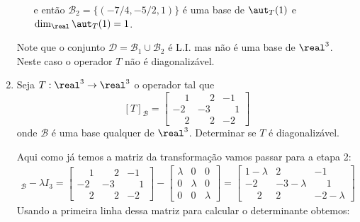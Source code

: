 \begin{exemplo}
\begin{enumerate}[label={\arabic*})]
\begin{solucao}
\begin{itemize}
\[                \]
                e então $\mathcal{B}_2 = \{(-7/4,-5/2,1)\}$ é uma base de $\aut_T(1)$ e $\dim_\real\aut_T(1) = 1$.
            \end{itemize}
            Note que o conjunto $\mathcal{D} = \mathcal{B}_1 \cup \mathcal{B}_2$ é L.I. mas não é uma base de $\real^3$. Neste caso o operador $T$ não é diagonalizável.
        \end{solucao}
        \item Seja $T : \real^3 \to \real^3$ o operador tal que
        \[
            [T]_\mathcal{B} = \begin{bmatrix}
                                \phantom{-}1 & \phantom{-}2 & -1\\
                                -2 & -3 & \phantom{-}1\\
                                \phantom{-}2 & \phantom{-}2 & -2
                            \end{bmatrix}
        \]
        onde $\mathcal{B}$ é uma base qualquer de $\real^3$. Determinar se $T$ é diagonalizável.
        \begin{solucao}
            Aqui como já temos a matriz da transformação vamos passar para a etapa 2:
            \begin{align*}
                [T]_\mathcal{B} - \lambda I_3 = \begin{bmatrix}\phantom{-}1 & \phantom{-}2 & -1\\-2 & -3 & \phantom{-}1\\\phantom{-}2 & \phantom{-}2 & -2\end{bmatrix} - \begin{bmatrix} \lambda & 0 & 0\\0 & \lambda & 0\\0 & 0 & \lambda\end{bmatrix} = \begin{bmatrix}1 - \lambda & 2 & -1\\-2 & -3 - \lambda & \phantom{-}1\\\phantom{-}2 & 2 &-2 - \lambda\end{bmatrix}
            \end{align*}
            Usando a primeira linha dessa matriz para calcular o determinante obtemos:
            \begin{align*}

\end{align*}
\end{solucao}
\end{enumerate}
\end{exemplo}
